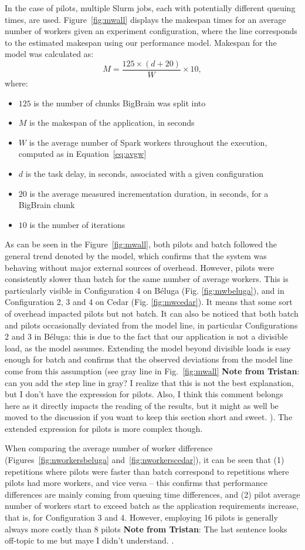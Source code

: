 \documentclass{IEEEtran}
\newcommand{\tristan}[1]{\color{red}\textbf{Note from Tristan}:
      #1 \color{black}}
\newcommand{\TG}[1]{\tristan{#1}}
\begin{document}
In the case of pilots, multiple Slurm jobs, each with potentially different queuing times,
are used. Figure~\ref{fig:mwall} displays the makespan times for an average number of workers
given an experiment configuration, where the line corresponds to the estimated makespan using 
our performance model. Makespan for the model was calculated as:
$$
M = \frac{125\times(d + 20)}{W}\times 10,
$$
where:
\begin{itemize}
    \item $125$ is the number of chunks BigBrain was split into
    \item $M$ is the makespan of the application, in seconds
    \item $W$ is the average number of Spark workers throughout the execution, computed as in Equation~\ref{eq:avgw}
    \item $d$ is the task delay, in seconds, associated with a given configuration
    \item $20$ is the average measured incrementation duration, in seconds, for a BigBrain chunk
    \item $10$ is the number of iterations
\end{itemize}
As can be seen in the Figure~\ref{fig:mwall}, both pilots and batch 
followed the general trend denoted by the model, which confirms that 
the system was behaving without major external sources of
overhead. However, pilots were consistently slower than batch for the same
number of average workers. This is particularly visible in Configuration 4
on B\'eluga (Fig. \ref{fig:mwbeluga}), and in Configuration 2, 3 and 4 on
Cedar (Fig. \ref{fig:mwcedar}). It means that some sort of overhead
impacted pilots but not batch. It can also be noticed that both batch and
pilots occasionally deviated from the model line, in particular
Configurations 2 and 3 in B\'eluga: this is due to the fact that our
application is not a divisible load, as the model assumes. Extending the
model beyond divisible loads is easy enough for batch and confirms that the
observed deviations from the model line come from this assumption (see gray
line in Fig.~\ref{fig:mwall} \TG{can you add the step line in gray? I
realize that this is not the best explanation, but I don't have the
expression for pilots. Also, I think this comment belongs here as it directly impacts
the reading of the results, but it might as well be moved to the discussion if you want to keep
this section short and sweet.}). The extended expression for pilots is more complex
though.

When
comparing the average number of worker difference
(Figures~\ref{fig:nworkersbeluga} and~\ref{fig:nworkerscedar}), it can be
seen that (1) repetitions where pilots were faster than batch correspond
to repetitions where pilots had more workers, and vice versa -- this
confirms that performance differences are mainly coming from queuing time
differences, and (2) pilot average number of workers start to exceed batch
as the application requirements increase, that is, for Configuration 3 and
4. However, employing 16 pilots
is generally always more costly than 8 pilots \TG{The last sentence looks off-topic to me but maye I didn't understand.}.
\end{document}
